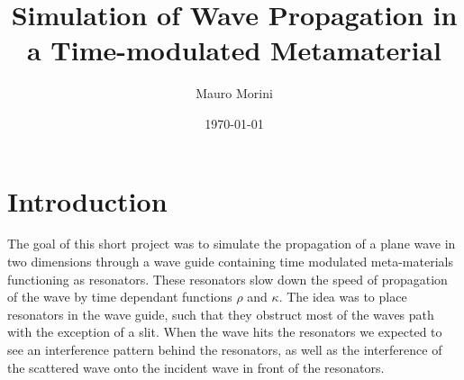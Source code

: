 \documentclass{article}
\title{Simulation of Wave Propagation in a Time-modulated Metamaterial}
\author{Mauro Morini}
\date{\today}
\begin{document}
\maketitle

\tableofcontents
\newpage
\section{Introduction}
The goal of this short project was to simulate the propagation of a plane wave in two dimensions through a wave guide containing time modulated meta-materials functioning as resonators. These resonators slow down the speed of propagation of the wave by time dependant functions $\rho$ and $\kappa$. The idea was to place resonators in the wave guide, such that they obstruct most of the waves path with the exception of a slit. When the wave hits the resonators we expected to see an interference pattern behind the resonators, as well as the interference of the scattered wave onto the incident wave in front of the resonators.
\end{document}
